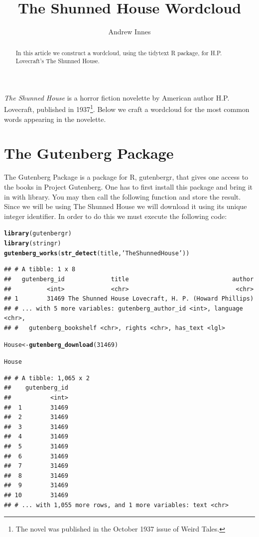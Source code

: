 \documentclass{article}\usepackage[]{graphicx}\usepackage[]{color}
\makeatletter
\newcommand{\hlnum}[1]{\textcolor[rgb]{0.686,0.059,0.569}{#1}}%
\newcommand{\hlstr}[1]{\textcolor[rgb]{0.192,0.494,0.8}{#1}}%
\newcommand{\hlstd}[1]{\textcolor[rgb]{0.345,0.345,0.345}{#1}}%
\newcommand{\hlkwb}[1]{\textcolor[rgb]{0.69,0.353,0.396}{#1}}%
\newcommand{\hlkwd}[1]{\textcolor[rgb]{0.737,0.353,0.396}{\textbf{#1}}}%
\newenvironment{kframe}{%
 \def\at@end@of@kframe{}%
 \ifinner\ifhmode%
  \def\at@end@of@kframe{\end{minipage}}%
  \begin{minipage}{\columnwidth}%
 \fi\fi%
 \def\FrameCommand##1{\hskip\@totalleftmargin \hskip-\fboxsep
 \colorbox{shadecolor}{##1}\hskip-\fboxsep
     \hskip-\linewidth \hskip-\@totalleftmargin \hskip\columnwidth}%
 \MakeFramed {\advance\hsize-\width
   \@totalleftmargin\z@ \linewidth\hsize
   \@setminipage}}%
 {\par\unskip\endMakeFramed%
 \at@end@of@kframe}
\newenvironment{knitrout}{}{} %
\makeatother
\begin{document}
\title{The Shunned House Wordcloud}
\author{Andrew Innes}
\maketitle

\begin{abstract}
In this article we construct a wordcloud, using the tidytext R package, for H.P. Lovecraft's The Shunned House.

\end{abstract}

\textit{The Shunned House} is a horror fiction novelette by American author H.P. Lovecraft, published in 1937\footnote{The novel was published in the October 1937 issue of Weird Tales.}.  Below we craft a wordcloud for the most common words appearing in the novelette.

\section{The Gutenberg Package}
The Gutenberg Package is a package for R, gutenbergr, that gives one access to the books in Project Gutenberg.  One has to first install this package and bring it in with library.  You may then call the following function and store the result.  Since we will be using The Shunned House we will download it using its unique integer identifier.  In order to do this we must execute the following code:

\begin{knitrout}
\color{fgcolor}\begin{kframe}
\begin{alltt}
\hlkwd{library}\hlstd{(gutenbergr)}
\hlkwd{library}\hlstd{(stringr)}
\hlkwd{gutenberg_works}\hlstd{(}\hlkwd{str_detect}\hlstd{(title,}\hlstr{'The Shunned House'}\hlstd{))}
\end{alltt}
\begin{verbatim}
## # A tibble: 1 x 8
##   gutenberg_id             title                             author
##          <int>             <chr>                              <chr>
## 1        31469 The Shunned House Lovecraft, H. P. (Howard Phillips)
## # ... with 5 more variables: gutenberg_author_id <int>, language <chr>,
## #   gutenberg_bookshelf <chr>, rights <chr>, has_text <lgl>
\end{verbatim}
\begin{alltt}
\hlstd{House}\hlkwb{<-}\hlkwd{gutenberg_download}\hlstd{(}\hlnum{31469}\hlstd{)}

\hlstd{House}
\end{alltt}
\begin{verbatim}
## # A tibble: 1,065 x 2
##    gutenberg_id
##           <int>
##  1        31469
##  2        31469
##  3        31469
##  4        31469
##  5        31469
##  6        31469
##  7        31469
##  8        31469
##  9        31469
## 10        31469
## # ... with 1,055 more rows, and 1 more variables: text <chr>
\end{verbatim}
\end{kframe}
\end{knitrout}
\end{document}
